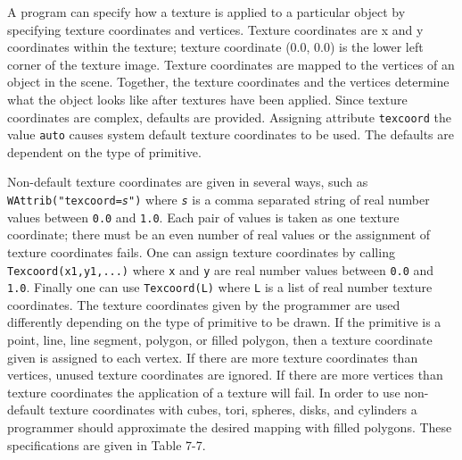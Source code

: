 A program can specify how a texture is applied to a particular object
by specifying texture coordinates and vertices. Texture coordinates
are x and y coordinates within the texture; texture coordinate (0.0,
0.0) is the lower left corner of the texture image. Texture
coordinates are mapped to the vertices of an object in the
scene. Together, the texture coordinates and the vertices determine
what the object looks like after textures have been applied.  Since
texture coordinates are complex, defaults are provided. Assigning
attribute \texttt{texcoord} the value \texttt{auto} causes system
default texture coordinates to be used. The defaults are dependent on
the type of primitive.

Non-default texture coordinates are given in several ways, such as \linebreak
\texttt{WAttrib("texcoord=}\texttt{\textit{s"}}\texttt{)}
where \texttt{\textit{s}} is a comma separated string of real number
values between \texttt{0.0} and \texttt{1.0}. Each pair of values is
taken as one texture coordinate; there must be an even number of real
values or the assignment of texture coordinates fails. One
can assign texture coordinates by calling \texttt{Texcoord(x1,y1,...)}
where \texttt{x} and \texttt{y} are real number values between
\texttt{0.0} and \texttt{1.0}. Finally one can use \texttt{Texcoord(L)}
where \texttt{L} is a list of real number texture coordinates. The
texture coordinates given by the programmer are used differently
depending on the type of primitive to be drawn. If the primitive is a
point, line, line segment, polygon, or filled polygon, then a texture
coordinate given is assigned to each vertex. If there are more texture
coordinates than vertices, unused texture coordinates are ignored. If
there are more vertices than texture coordinates the application of a
texture will fail. In order to use non-default texture coordinates
with cubes, tori, spheres, disks, and cylinders a programmer should
approximate the desired mapping with filled polygons. These
specifications are given in Table 7-7.


